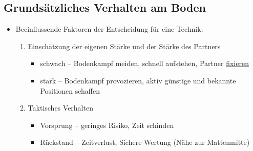 \documentclass[justified, a4paper, notitlepage, captions=tableheading, nobib]{tufte-handout}
\begin{document}
\subsection{Grundsätzliches Verhalten am Boden}
\label{sec:org124687b}
\begin{itemize}
\item Beeinflussende Faktoren der Entscheidung für eine Technik:
\begin{enumerate}
\item Einschätzung der eigenen Stärke und der Stärke des Partners
\begin{itemize}
\item schwach -- Bodenkampf meiden, schnell aufstehen, Partner \hyperref[org62822f6]{fixieren}
\item stark -- Bodenkampf provozieren, aktiv günstige und bekannte Positionen schaffen
\end{itemize}
\item Taktisches Verhalten
\begin{itemize}
\item Vorsprung -- geringes Risiko, Zeit schinden
\item Rückstand -- Zeitverlust, Sichere Wertung (Nähe zur Mattenmitte)
\end{itemize}
\end{enumerate}


\end{itemize}
\end{document}
